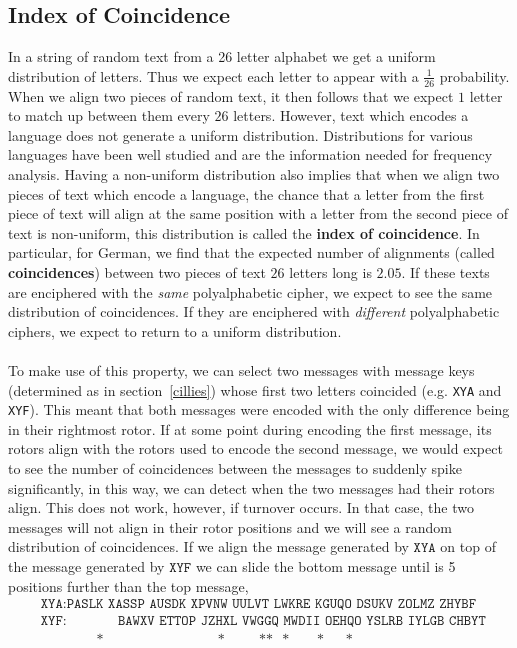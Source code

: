 \subsection{Index of Coincidence}\label{ioc}
In a string of random text from a 26 letter alphabet we get a uniform
distribution of letters. Thus we expect each letter to appear with a $\frac{1}{26}$ probability. When we align two pieces of random text, it then follows that we expect $1$ letter to match up between them every $26$ letters. However, text which encodes a language does
not generate a uniform distribution. Distributions for various
languages have been well studied and are the information needed for
frequency analysis. Having a non-uniform distribution also implies
that when we align two pieces of text which encode a language, the chance that a letter from the first piece of text will align at the same position with a letter
from the second piece of text is non-uniform, this distribution is called the {\bf{index of coincidence}}. In particular, for German, we find that the expected number of alignments (called {\bf{coincidences}}) between two pieces of text $26$ letters long is $2.05$. If these texts
are enciphered with the \emph{same} polyalphabetic cipher, we expect to see the same distribution of coincidences. If they are enciphered with \emph{different} polyalphabetic ciphers, we expect to return to a uniform distribution.
\\\\To make use of this property, we can select two messages with
message keys (determined as in section~\ref{cillies}) whose first two letters coincided (e.g. \texttt{XYA} and
\texttt{XYF}). This meant that both messages were encoded with the
only difference being in their rightmost rotor. If at some point
during encoding the first message, its rotors align with the rotors
used to encode the second message, we would expect to see the number
of coincidences between the messages to suddenly spike significantly,
in this way, we can detect when the two messages had their rotors
align. This does not work, however, if turnover occurs. In that case, the two
messages will not align in their rotor positions and we will see a
random distribution of coincidences. If we align the message
generated by $\texttt{XYA}$ on top of the message generated by
$\texttt{XYF}$ we can slide the bottom message until is 5 positions
further than the top message,
\begin{align*}
	 & \texttt{XYA}: \texttt{PASLK XASSP AUSDK XPVNW UULVT LWKRE KGUQO
		DSUKV ZOLMZ ZHYBF}
	\\
	 & \texttt{XYF}: \texttt{ }\texttt{ }\texttt{ }\texttt{ }\texttt{
	}\texttt{ }\texttt{BAWXV ETTOP JZHXL VWGGQ MWDII OEHQO YSLRB IYLGB
		CHBYT }
	\\
	 &
	\ \ \ \ \ \ \ \ \ \ \ \ \ \ \ \ \ \ \texttt{*}\ \ \ \ \ \ \ \ \ \ \ \ \ \ \ \ \ \ \ \ \ \ \ \ \ \ \ \ \ \ \ \ \ \ \ \ \ \texttt{*}\ \ \ \ \ \ \ \ \ \ \ \texttt{**}\ \ \ \texttt{*}\ \ \ \ \ \ \ \ \ \texttt{*}\ \ \ \ \ \ \ \texttt{*}
\end{align*}
